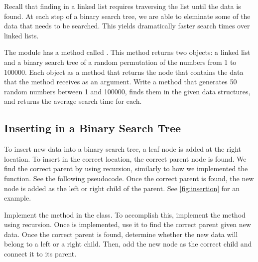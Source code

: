 Recall that finding in a linked list requires traversing the list until the data is found.
At each step of a binary search tree, we are able to eleminate some of the data that needs to be searched.
This yields dramatically faster search times over linked lists.

\begin{problem}
The  module has a method called .
This method returns two objects: a linked list and a binary search tree of a random permutation of the numbers from 1 to 100000.
Each object as a  method that returns the node that contains the data that the  method receives as an argument.
Write a method that generates 50 random numbers between 1 and 100000, finds them in the given data structures, and returns the average search time for each.
\end{problem}

\subsection*{Inserting in a Binary Search Tree}

To insert new data into a binary search tree, a leaf node is added at the right location.
To insert in the correct location, the correct parent node is found.
We find the correct parent by using recursion, similarly to how we implemented the  function.  See the following pseudocode.
Once the correct parent is found, the new node is added as the left or right child of the parent.
See \ref{fig:insertion} for an example.
\begin{comment}
\begin{lstlisting}
"""Pseudocode for finding the correct parent of a new node

find the parent of node, data
	if data < node.data:
		if node.left is not None 
			find the parent of node.left, data
		else:
			return node
	if data > node.right:
		if data > node.data:
			if node.right is not None:
				find the parent of node.right, data
			else:
				return node
"""
\end{lstlisting}
\end{comment}
\begin{problem}
Implement the  method in the  class.
To accomplish this, implement the  method using recursion.
Once  is implemented, use it to find the correct parent given new data.
Once the correct parent is found, determine whether the new data will belong to a left or a right child.
Then, add the new node as the correct child and connect it to its parent.
\end{problem}

